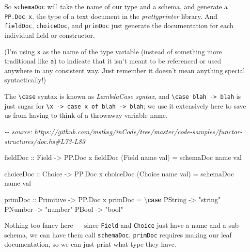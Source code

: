 \documentclass[]{article}
\newenvironment{Shaded}{}{}
\newcommand{\CommentTok}[1]{\textcolor[rgb]{0.38,0.63,0.69}{\textit{#1}}}
\newcommand{\DataTypeTok}[1]{\textcolor[rgb]{0.56,0.13,0.00}{#1}}
\newcommand{\KeywordTok}[1]{\textcolor[rgb]{0.00,0.44,0.13}{\textbf{#1}}}
\newcommand{\NormalTok}[1]{#1}
\newcommand{\OtherTok}[1]{\textcolor[rgb]{0.00,0.44,0.13}{#1}}
\newcommand{\StringTok}[1]{\textcolor[rgb]{0.25,0.44,0.63}{#1}}
\begin{document}
So \texttt{schemaDoc} will take the name of our type and a schema, and generate
a \texttt{PP.Doc\ x}, the type of a text document in the \emph{prettyprinter}
library. And \texttt{fieldDoc}, \texttt{choiceDoc}, and \texttt{primDoc} just
generate the documentation for each individual field or constructor.

(I'm using \texttt{x} as the name of the type variable (instead of something
more traditional like \texttt{a}) to indicate that it isn't meant to be
referenced or used anywhere in any consistent way. Just remember it doesn't mean
anything special syntactically!)

The \texttt{\textbackslash{}case} syntax is known as \emph{LambdaCase syntax},
and \texttt{\textbackslash{}case\ blah\ -\textgreater{}\ blah} is just sugar for
\texttt{\textbackslash{}x\ -\textgreater{}\ case\ x\ of\ blah\ -\textgreater{}\ blah};
we use it extensively here to save us from having to think of a throwaway
variable name.

\begin{Shaded}
\begin{Highlighting}[]
\CommentTok{{-}{-} source: https://github.com/mstksg/inCode/tree/master/code{-}samples/functor{-}structures/doc.hs\#L73{-}L83}

\OtherTok{fieldDoc ::} \DataTypeTok{Field} \OtherTok{{-}\textgreater{}} \DataTypeTok{PP.Doc}\NormalTok{ x}
\NormalTok{fieldDoc (}\DataTypeTok{Field}\NormalTok{ name val) }\OtherTok{=}\NormalTok{ schemaDoc name val}

\OtherTok{choiceDoc ::} \DataTypeTok{Choice} \OtherTok{{-}\textgreater{}} \DataTypeTok{PP.Doc}\NormalTok{ x}
\NormalTok{choiceDoc (}\DataTypeTok{Choice}\NormalTok{ name val) }\OtherTok{=}\NormalTok{ schemaDoc name val}

\OtherTok{primDoc ::} \DataTypeTok{Primitive} \OtherTok{{-}\textgreater{}} \DataTypeTok{PP.Doc}\NormalTok{ x}
\NormalTok{primDoc }\OtherTok{=}\NormalTok{ \textbackslash{}}\KeywordTok{case}
  \DataTypeTok{PString} \OtherTok{{-}\textgreater{}} \StringTok{"string"}
  \DataTypeTok{PNumber} \OtherTok{{-}\textgreater{}} \StringTok{"number"}
  \DataTypeTok{PBool}   \OtherTok{{-}\textgreater{}} \StringTok{"bool"}
\end{Highlighting}
\end{Shaded}

Nothing too fancy here --- since \texttt{Field} and \texttt{Choice} just have a
name and a sub-schema, we can have them call \texttt{schemaDoc}.
\texttt{primDoc} requires making our leaf documentation, so we can just print
what type they have.
\end{document}
